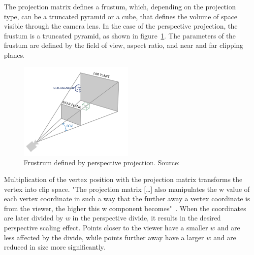 
The projection matrix defines a frustum, which, depending on the projection type, can be a truncated pyramid or a cube,
that defines the volume of space visible through the camera lens.
In the case of the perspective projection, the frustum is a truncated pyramid, as shown in figure~\ref{fig:perspective}.
The parameters of the frustum are defined by the field of view, aspect ratio, and near and far clipping planes.
\begin{figure}[h!]
    \centering
    \includegraphics[width=0.50\textwidth]{images/perspective}
    \caption{Frustrum defined by perspective projection. Source: \cite{de_vries_learn_2020}}
    \label{fig:perspective}
\end{figure}
Multiplication of the vertex position with the projection matrix transforms the vertex into clip space.
"The projection matrix [\ldots] also manipulates the w value of each vertex coordinate in such a way
that the further away a vertex coordinate is from the viewer, the higher this w component becomes"~\parencite{de_vries_learn_2020}.
When the coordinates are later divided by $w$ in the perspective divide,
it results in the desired perspective scaling effect.
Points closer to the viewer have a smaller $w$ and are less affected by the divide,
while points further away have a larger $w$ and are reduced in size more significantly.

